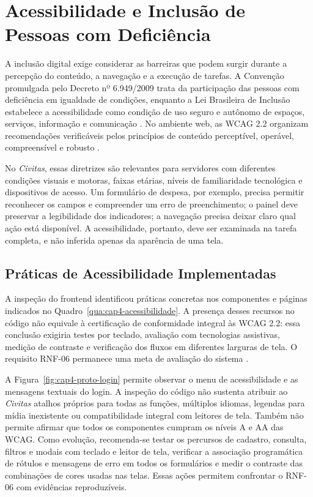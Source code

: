 \section{Acessibilidade e Inclusão de Pessoas com Deficiência}

A inclusão digital exige considerar as barreiras que podem surgir durante a percepção do conteúdo, a navegação e a execução de tarefas. A Convenção promulgada pelo Decreto nº 6.949/2009 trata da participação das pessoas com deficiência em igualdade de condições, enquanto a Lei Brasileira de Inclusão estabelece a acessibilidade como condição de uso seguro e autônomo de espaços, serviços, informação e comunicação \parencite{Brasil2009,Brasil2015}. No ambiente web, as WCAG 2.2 organizam recomendações verificáveis pelos princípios de conteúdo perceptível, operável, compreensível e robusto \parencite{W3CWCAG22_2024}.

No \textit{Civitas}, essas diretrizes são relevantes para servidores com diferentes condições visuais e motoras, faixas etárias, níveis de familiaridade tecnológica e dispositivos de acesso. Um formulário de despesa, por exemplo, precisa permitir reconhecer os campos e compreender um erro de preenchimento; o painel deve preservar a legibilidade dos indicadores; a navegação precisa deixar claro qual ação está disponível. A acessibilidade, portanto, deve ser examinada na tarefa completa, e não inferida apenas da aparência de uma tela.

\subsection{Práticas de Acessibilidade Implementadas}

A inspeção do frontend identificou práticas concretas nos componentes e páginas indicados no Quadro~\ref{qua:cap4-acessibilidade}. A presença desses recursos no código não equivale à certificação de conformidade integral às WCAG 2.2: essa conclusão exigiria testes por teclado, avaliação com tecnologias assistivas, medição de contraste e verificação dos fluxos em diferentes larguras de tela. O requisito RNF-06 permanece uma meta de avaliação do sistema \parencite{CivitasFrontend2026,W3CWCAG22_2024}.

A Figura~\ref{fig:cap4-proto-login} permite observar o menu de acessibilidade e as mensagens textuais do login. A inspeção do código não sustenta atribuir ao \textit{Civitas} atalhos próprios para todas as funções, múltiplos idiomas, legendas para mídia inexistente ou compatibilidade integral com leitores de tela. Também não permite afirmar que todos os componentes cumpram os níveis A e AA das WCAG. Como evolução, recomenda-se testar os percursos de cadastro, consulta, filtros e modais com teclado e leitor de tela, verificar a associação programática de rótulos e mensagens de erro em todos os formulários e medir o contraste das combinações de cores usadas nas telas. Essas ações permitem confrontar o RNF-06 com evidências reproduzíveis.

